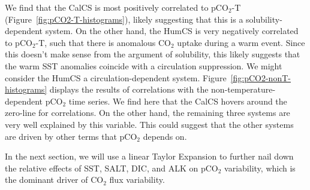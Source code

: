 \documentclass[12pt]{article}
\begin{document}
We find that the CalCS is most positively correlated to pCO$_{2}$-T (Figure~\ref{fig:pCO2-T-histograms}), likely suggesting that this is a solubility-dependent system. On the other hand, the HumCS is very negatively correlated to pCO$_{2}$-T, such that there is anomalous CO$_{2}$ uptake during a warm event. Since this doesn't make sense from the argument of solubility, this likely suggests that the warm SST anomalies coincide with a circulation suppression. We might consider the HumCS a circulation-dependent system. Figure~\ref{fig:pCO2-nonT-histograms} displays the results of correlations with the non-temperature-dependent pCO$_{2}$ time series. We find here that the CalCS hovers around the zero-line for correlations. On the other hand, the remaining three systems are very well explained by this variable. This could suggest that the other systems are driven by other terms that pCO$_{2}$ depends on.

In the next section, we will use a linear Taylor Expansion to further nail down the relative effects of SST, SALT, DIC, and ALK on pCO$_{2}$ variability, which is the dominant driver of CO$_{2}$ flux variability.
\end{document}
